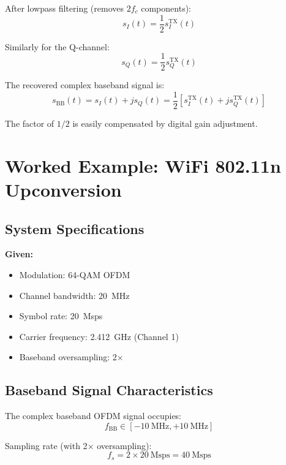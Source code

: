 After lowpass filtering (removes $2f_c$ components):
\begin{equation}
s_I(t) = \frac{1}{2}s_I^{\text{TX}}(t)
\end{equation}

Similarly for the Q-channel:
\begin{equation}
s_Q(t) = \frac{1}{2}s_Q^{\text{TX}}(t)
\end{equation}

The recovered complex baseband signal is:
\begin{equation}
s_{\text{BB}}(t) = s_I(t) + js_Q(t) = \frac{1}{2}[s_I^{\text{TX}}(t) + js_Q^{\text{TX}}(t)]
\end{equation}

The factor of $1/2$ is easily compensated by digital gain adjustment.

\section{Worked Example: WiFi 802.11n Upconversion}

\subsection{System Specifications}

\textbf{Given:}
\begin{itemize}
\item Modulation: 64-QAM OFDM
\item Channel bandwidth: 20~MHz
\item Symbol rate: 20~Msps
\item Carrier frequency: 2.412~GHz (Channel 1)
\item Baseband oversampling: 2$\times$
\end{itemize}

\subsection{Baseband Signal Characteristics}

The complex baseband OFDM signal occupies:
\begin{equation}
f_{\text{BB}} \in [-10~\text{MHz}, +10~\text{MHz}]
\end{equation}

Sampling rate (with 2$\times$ oversampling):
\begin{equation}
f_s = 2 \times 20~\text{Msps} = 40~\text{Msps}
\end{equation}

